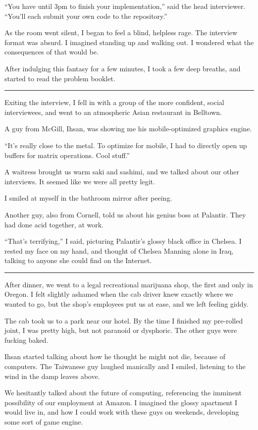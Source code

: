 ``You have until 3pm to finish your implementation,'' said the head interviewer.
``You'll each submit your own code to the repository.''

As the room went silent, I began to feel a blind, helpless rage.  The interview
format was absurd.  I imagined standing up and walking out.  I wondered what the
consequences of that would be.  

After indulging this fantasy for a few minutes, I took a few deep breaths, and
started to read the problem booklet.

\plainfancybreak{12pt}{2}{}

Exiting the interview, I fell in with a group of the more confident, social
interviewees, and went to an atmospheric Asian restaurant in Belltown.

A guy from McGill, Ihsan, was showing me his mobile-optimized graphics engine.

``It's really close to the metal.  To optimize for mobile, I had to directly
open up buffers for matrix operations.  Cool stuff.''

A waitress brought us warm saki and sashimi, and we talked about our other
interviews.  It seemed like we were all pretty legit.

I smiled at myself in the bathroom mirror after peeing.  

Another guy, also from Cornell, told us about his genius boss at Palantir.  They
had done acid together, at work.

``That's terrifying,'' I said, picturing Palantir's glossy black office in
Chelsea.  I rested my face on my hand, and thought of Chelsea Manning alone in
Iraq, talking to anyone she could find on the Internet.

\plainfancybreak{12pt}{2}{}

After dinner, we went to a legal recreational marijuana shop, the first and only
in Oregon.  I felt slightly ashamed when the cab driver knew exactly where we
wanted to go, but the shop's employees put us at ease, and we left feeling
giddy.  

The cab took us to a park near our hotel.  By the time I finished my pre-rolled
joint, I was pretty high, but not paranoid or dysphoric.   The other guys were
fucking baked.  

Ihsan started talking about how he thought he might not die, because of
computers.  The Taiwanese guy laughed manically and I smiled, listening to the
wind in the damp leaves above.

We hesitantly talked about the future of computing, referencing the imminent
possibility of our employment at Amazon.  I imagined the glossy apartment I
would live in, and how I could work with these guys on weekends, developing some
sort of game engine.

